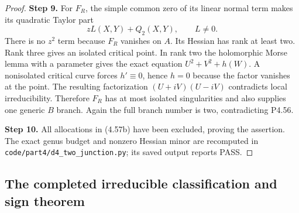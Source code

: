 \begin{proof}
\noindent\textbf{Step 9.} For $F_R$, the simple common zero of its linear normal
term makes its quadratic Taylor part
\[
                       zL(X,Y)+Q_2(X,Y),\qquad L\ne0.
\]
There is no $z^2$ term because $F_R$ vanishes on $A$.
Its Hessian has rank at least two. Rank three gives an
isolated critical point. In rank two the holomorphic
Morse lemma with a parameter gives the exact equation
$U^2+V^2+h(W)$. A nonisolated critical curve forces
$h'\equiv0$, hence $h=0$ because the factor vanishes
at the point. The resulting factorization
$(U+iV)(U-iV)$ contradicts local irreducibility.
Therefore $F_R$ has at most isolated singularities and
also supplies one generic $B$ branch. Again the full
branch number is two, contradicting P4.56.

\noindent\textbf{Step 10.} All allocations in (4.57b) have been excluded, proving
the assertion. The exact genus budget and nonzero
Hessian minor are recomputed in
\texttt{code/part4/d4\_two\_junction.py}; its saved
output reports PASS.
\end{proof}


\subsection{The completed irreducible classification and sign theorem}


